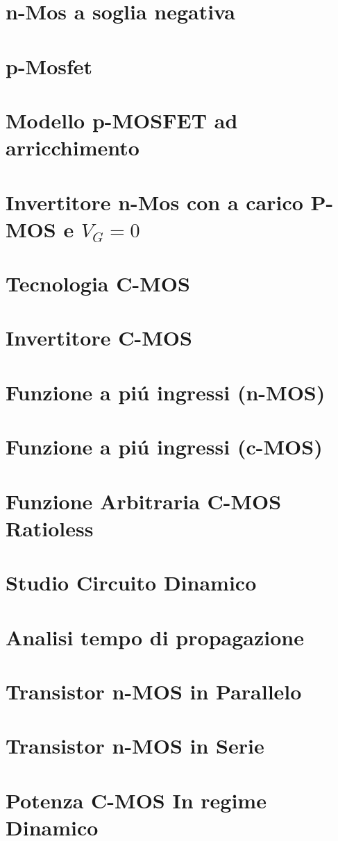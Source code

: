 \documentclass{article}
\begin{document}
\section{n-Mos a soglia negativa}
\section{p-Mosfet}
\section{Modello p-MOSFET ad arricchimento}
\section{Invertitore n-Mos con a carico P-MOS e $V_G = 0$}
\section{Tecnologia C-MOS}
\section{Invertitore C-MOS}
\section{Funzione a pi\'u ingressi (n-MOS)}
\section{Funzione a pi\'u ingressi (c-MOS)}
\section{Funzione Arbitraria C-MOS Ratioless}
\section{Studio Circuito Dinamico}
\section{Analisi tempo di propagazione}
\section{Transistor n-MOS in Parallelo}
\section{Transistor n-MOS in Serie}
\section{Potenza C-MOS In regime Dinamico}
% 
% 
\end{document}
